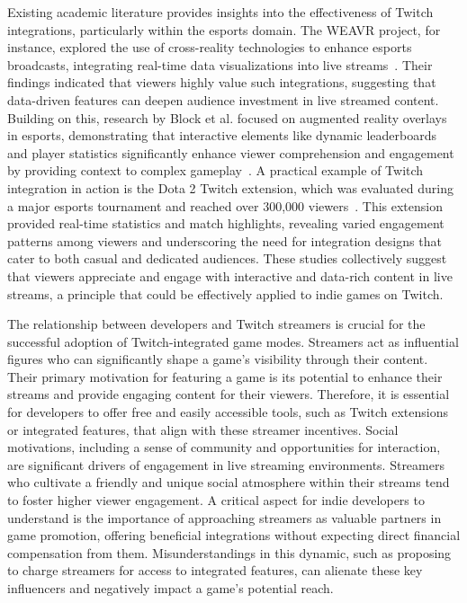 \documentclass[conference]{IEEEtran}
\begin{document}
Existing academic literature provides insights into the effectiveness of Twitch integrations, particularly within the esports domain. The WEAVR project, for instance, explored the use of cross-reality technologies to enhance esports broadcasts, integrating real-time data visualizations into live streams~\cite{weavr_whitepaper}. Their findings indicated that viewers highly value such integrations, suggesting that data-driven features can deepen audience investment in live streamed content. Building on this, research by Block et al. focused on augmented reality overlays in esports, demonstrating that interactive elements like dynamic leaderboards and player statistics significantly enhance viewer comprehension and engagement by providing context to complex gameplay~\cite{block2018narrative}. A practical example of Twitch integration in action is the Dota 2 Twitch extension, which was evaluated during a major esports tournament and reached over 300,000 viewers~\cite{10.1145/3639701.3656318}. This extension provided real-time statistics and match highlights, revealing varied engagement patterns among viewers and underscoring the need for integration designs that cater to both casual and dedicated audiences. These studies collectively suggest that viewers appreciate and engage with interactive and data-rich content in live streams, a principle that could be effectively applied to indie games on Twitch.

The relationship between developers and Twitch streamers is crucial for the successful adoption of Twitch-integrated game modes. Streamers act as influential figures who can significantly shape a game's visibility through their content. Their primary motivation for featuring a game is its potential to enhance their streams and provide engaging content for their viewers. Therefore, it is essential for developers to offer free and easily accessible tools, such as Twitch extensions or integrated features, that align with these streamer incentives. Social motivations, including a sense of community and opportunities for interaction, are significant drivers of engagement in live streaming environments. Streamers who cultivate a friendly and unique social atmosphere within their streams tend to foster higher viewer engagement. A critical aspect for indie developers to understand is the importance of approaching streamers as valuable partners in game promotion, offering beneficial integrations without expecting direct financial compensation from them. Misunderstandings in this dynamic, such as proposing to charge streamers for access to integrated features, can alienate these key influencers and negatively impact a game's potential reach.
\end{document}
